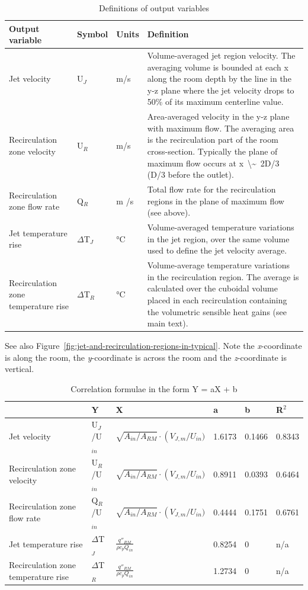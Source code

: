 \begin{longtable}[c]{p{1.25in}p{0.5in}p{0.5in}p{3.0in}}
\caption{Definitions of output variables \protect \label{table:definitions-of-output-variables}}\\
\toprule 
Output variable & Symbol & Units & Definition \tabularnewline \midrule
\endhead
Jet velocity & U\(_J\) & m/s & Volume-averaged jet region velocity. The averaging volume is bounded at each x along the room depth by the line in the y-z plane where the jet velocity drops to 50\% of its maximum centerline value. \tabularnewline
Recirculation zone velocity & U\(_R\) & m/s & Area-averaged velocity in the y-z plane with maximum flow. The averaging area is the recirculation part of the room cross-section. Typically the plane of maximum flow occurs at x~\textbackslash\~{}~2D/3 (D/3 before the outlet). \tabularnewline
Recirculation zone flow rate & Q\(_R\) & m  /s & Total flow rate for the recirculation regions in the plane of maximum flow (see above). \tabularnewline
Jet temperature rise & $\Delta$T\(_J\) & °C & Volume-averaged temperature variations in the jet region, over the same volume used to define the jet velocity average. \tabularnewline
Recirculation zone temperature rise & $\Delta$T\(_R\) & °C & Volume-average temperature variations in the recirculation region. The average is calculated over the cuboidal volume placed in each recirculation containing the volumetric sensible heat gains (see main text). \tabularnewline
\bottomrule
\end{longtable}

See also Figure~\ref{fig:jet-and-recirculation-regions-in-typical}. Note the \emph{x}-coordinate is along the room, the \emph{y}-coordinate is across the room and the \emph{z}-coordinate is vertical.

\begin{longtable}[c]{p{1.0in}p{0.5in}p{2.0in}p{0.5in}p{0.5in}p{0.5in}}
\caption{Correlation formulae in the form Y = aX + b \protect \label{table:correlation-formulae-in-the-form-y-ax-+-b}}\\
\toprule 
~ & Y & X & a & b & R\(^2\) \tabularnewline \midrule
\endhead
Jet velocity & U\(_J\)/U\(_{in}\) & $\sqrt{A_{in}/A_{RM}} \cdot \left(V_{J,m}/U_{in})$ & 1.6173 & 0.1466 & 0.8343 \tabularnewline
Recirculation zone velocity & U\(_R\)/U\(_{in}\) & $\sqrt{A_{in}/A_{RM}} \cdot \left(V_{J,m}/U_{in})$ & 0.8911 & 0.0393 & 0.6464 \tabularnewline
Recirculation zone flow rate & Q\(_R\)/U\(_{in}\) & $\sqrt{A_{in}/A_{RM}} \cdot \left(V_{J,m}/U_{in})$ & 0.4444 & 0.1751 & 0.6761 \tabularnewline
Jet temperature rise & $\Delta$T\(_J\) & $\frac{q''_{RM}}{\rho {c_p}{Q_{in}}}$ & 0.8254 & 0 & n/a \tabularnewline
Recirculation zone temperature rise & $\Delta$T\(_R\) & $\frac{q''_{RM}}{\rho {c_p}{Q_{in}}}$ & 1.2734 & 0 & n/a \tabularnewline
\bottomrule
\end{longtable}

